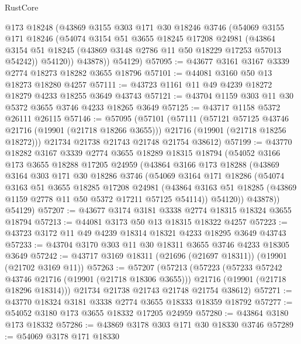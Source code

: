 \begin{lexlean}{RustCore}
\begin{coremodule}
        @173
        @18248
        (@43869
          @3155
          @303
          @171
          @30
          @18246
          @3746
          (@54069
            @3155
            @171
            @18246
            (@54074
              @3154
              @51
              @3655
              @18245
              @17208
              @24981
              (@43864 @3154 @51 @18245 (@43869 @3148 @2786 @11 @50 @18229 @17253 @57013 @54242))
              @54120))
          @43878))
      @54129)
@57095 := @43677 @3161 @3167 @3339 @2774 @18273 @18282 @3655 @18796
@57101 := @44081 @3160 @50 @13 @18273 @18280 @4257
@57111 := @43723 @1161 @11 @49 @4239 @18272 @18279 @4233 @18255 @3649 @43743
@57121 := @43704 @1159 @303 @11 @30 @5372 @3655 @3746 @4233 @18265 @3649
@57125 := @43717 @1158 @5372 @26111 @26115
@57146 := @57095
    (@57101
      (@57111
        (@57121 @57125 @43746 @21716 (@19901 (@21718 @18266 @3655)))
        @21716
        (@19901 (@21718 @18256 @18272)))
      @21734
      @21738
      @21743
      @21748
      @21754
      @38612)
@57199 := @43770
    @18282
    @3167
    @3339
    @2774
    @3655
    @18289
    @18315
    @18794
    (@54052
      @3166
      @173
      @3655
      @18288
      @17205
      @24959
      (@43864
        @3166
        @173
        @18288
        (@43869
          @3164
          @303
          @171
          @30
          @18286
          @3746
          (@54069
            @3164
            @171
            @18286
            (@54074
              @3163
              @51
              @3655
              @18285
              @17208
              @24981
              (@43864 @3163 @51 @18285 (@43869 @1159 @2778 @11 @50 @5372 @17211 @57125 @54114))
              @54120))
          @43878))
      @54129)
@57207 := @43677 @3174 @3181 @3338 @2774 @18315 @18324 @3655 @18794
@57213 := @44081 @3173 @50 @13 @18315 @18322 @4257
@57223 := @43723 @3172 @11 @49 @4239 @18314 @18321 @4233 @18295 @3649 @43743
@57233 := @43704 @3170 @303 @11 @30 @18311 @3655 @3746 @4233 @18305 @3649
@57242 := @43717 @3169 @18311 (@21696 (@21697 @18311)) (@19901 (@21702 @3169 @11))
@57263 := @57207
    (@57213
      (@57223
        (@57233 @57242 @43746 @21716 (@19901 (@21718 @18306 @3655)))
        @21716
        (@19901 (@21718 @18296 @18314)))
      @21734
      @21738
      @21743
      @21748
      @21754
      @38612)
@57271 := @43770 @18324 @3181 @3338 @2774 @3655 @18333 @18359 @18792
@57277 := @54052 @3180 @173 @3655 @18332 @17205 @24959
@57280 := @43864 @3180 @173 @18332
@57286 := @43869 @3178 @303 @171 @30 @18330 @3746
@57289 := @54069 @3178 @171 @18330

\end{coremodule}
\end{lexlean}
